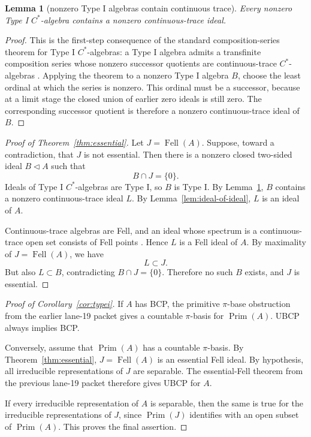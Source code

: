 \documentclass[11pt]{article}
\newtheorem{lemma}{Lemma}
\newcommand{\Prim}{\operatorname{Prim}}
\newcommand{\Fell}{\operatorname{Fell}}
\begin{document}
\begin{lemma}[nonzero Type I algebras contain continuous trace]
\label{lem:typei-ct}
Every nonzero Type I \(C^*\)-algebra contains a nonzero continuous-trace
ideal.
\end{lemma}

\begin{proof}
This is the first-step consequence of the standard composition-series theorem
for Type I \(C^*\)-algebras: a Type I algebra admits a transfinite
composition series whose nonzero successor quotients are continuous-trace
\(C^*\)-algebras \cite[Chapter 4]{Dixmier}.  Applying the theorem to a
nonzero Type I algebra \(B\), choose the least ordinal at which the series is
nonzero.  This ordinal must be a successor, because at a limit stage the
closed union of earlier zero ideals is still zero.  The corresponding
successor quotient is therefore a nonzero continuous-trace ideal of \(B\).
\end{proof}

\begin{proof}[Proof of Theorem~\ref{thm:essential}]
Let \(J=\Fell(A)\).  Suppose, toward a contradiction, that \(J\) is not
essential.  Then there is a nonzero closed two-sided ideal \(B\triangleleft A\)
such that
\[
        B\cap J=\{0\}.
\]
Ideals of Type I \(C^*\)-algebras are Type I, so \(B\) is Type I.  By
Lemma~\ref{lem:typei-ct}, \(B\) contains a nonzero continuous-trace ideal
\(L\).  By Lemma~\ref{lem:ideal-of-ideal}, \(L\) is an ideal of \(A\).

Continuous-trace algebras are Fell, and an ideal whose spectrum is a
continuous-trace open set consists of Fell points \cite{CHR,RW}.  Hence
\(L\) is a Fell ideal of \(A\).  By maximality of \(J=\Fell(A)\), we have
\[
        L\subset J.
\]
But also \(L\subset B\), contradicting \(B\cap J=\{0\}\).  Therefore no such
\(B\) exists, and \(J\) is essential.
\end{proof}

\begin{proof}[Proof of Corollary~\ref{cor:typei}]
If \(A\) has BCP, the primitive \(\pi\)-base obstruction from the earlier
lane-19 packet gives a countable \(\pi\)-basis for \(\Prim(A)\).  UBCP
always implies BCP.

Conversely, assume that \(\Prim(A)\) has a countable \(\pi\)-basis.  By
Theorem~\ref{thm:essential}, \(J=\Fell(A)\) is an essential Fell ideal.  By
hypothesis, all irreducible representations of \(J\) are separable.  The
essential-Fell theorem from the previous lane-19 packet \cite{lane19essential}
therefore gives UBCP for \(A\).

If every irreducible representation of \(A\) is separable, then the same is
true for the irreducible representations of \(J\), since
\(\Prim(J)\) identifies with an open subset of \(\Prim(A)\).  This proves the
final assertion.
\end{proof}
\end{document}
